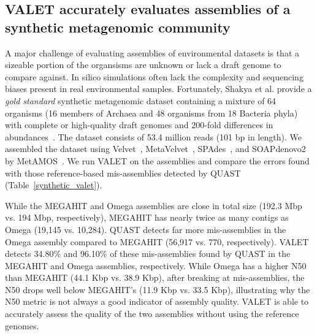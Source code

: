 \documentclass{article}
\begin{document}
\subsection{VALET accurately evaluates assemblies of a synthetic metagenomic community}

A major challenge of evaluating assemblies of environmental datasets is that a sizeable portion of the organsisms are unknown or lack a draft genome to compare against.
In silico simulations often lack the complexity and sequencing biases present in real environmental samples.
Fortunately, Shakya et al. provide a \emph{gold standard} synthetic metagenomic dataset containing a mixture of 64 organisms (16 members of Archaea and 48 organisms from 18 Bacteria phyla) with complete or high-quality draft genomes and 200-fold differences in abundances~\citep{shakya2013comparative}.
The dataset consists of 53.4 million reads (101 bp in length).
We assembled the dataset using Velvet~\citep{zerbino2008velvet}, MetaVelvet~\citep{namiki2012metavelvet}, SPAdes~\citep{bankevich2012spades}, and SOAPdenovo2~\citep{luo2012soapdenovo2} by MetAMOS~\citep{treangen2013metamos}.
We run VALET on the assemblies and compare the errors found with those reference-based mis-assemblies detected by QUAST (Table~\ref{synthetic_valet}).

While the MEGAHIT and Omega assemblies are close in total size (192.3 Mbp vs. 194 Mbp, respectively), MEGAHIT has nearly twice as many contigs as Omega (19,145 vs. 10,284).
QUAST detects far more mis-assemblies in the Omega assembly compared to MEGAHIT (56,917 vs. 770, respectively).
VALET detects 34.80\% and 96.10\% of these mis-assemblies found by QUAST in the MEGAHIT and Omega assemblies, respectively.
While Omega has a higher N50 than MEGAHIT (44.1 Kbp vs. 38.9 Kbp), after breaking at mis-assemblies, the N50 drops well below MEGAHIT's (11.9 Kbp vs. 33.5 Kbp), illustrating why the N50 metric is not always a good indicator of assembly quality.
VALET is able to accurately assess the quality of the two assemblies without using the reference genomes.
\end{document}

